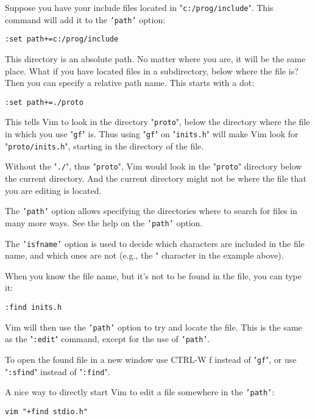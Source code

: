 Suppose you have your include files located in "\texttt{c:/prog/include}".
This command will add it to the \texttt{'path'} option:

\begin{Verbatim}[samepage=true]
 :set path+=c:/prog/include
\end{Verbatim}

This directory is an absolute path.
No matter where you are, it will be the same place.
What if you have located files in a subdirectory, below where the file is?  Then you can specify a relative path name.
This starts with a dot:

\begin{Verbatim}[samepage=true]
 :set path+=./proto
\end{Verbatim}

This tells Vim to look in the directory "\texttt{proto}", below the directory where the file in which you use "\texttt{gf}" is.
Thus using "\texttt{gf}" on "\texttt{inits.h}" will make Vim look for "\texttt{proto/inits.h}", starting in the directory of the file.

Without the "\texttt{./}", thus "\texttt{proto}", Vim would look in the "\texttt{proto}" directory below the current directory.
And the current directory might not be where the file that you are editing is located.

The \texttt{'path'} option allows specifying the directories where to search for files in many more ways.
See the help on the \texttt{'path'} option.

The \texttt{'isfname'} option is used to decide which characters are included in the file name, and which ones are not (e.g., the " character in the example above).

When you know the file name, but it's not to be found in the file, you can type it:

\begin{Verbatim}[samepage=true]
 :find inits.h
\end{Verbatim}

Vim will then use the \texttt{'path'} option to try and locate the file.
This is the same as the "\texttt{:edit}" command, except for the use of \texttt{'path'}.

To open the found file in a new window use CTRL-W f instead of "\texttt{gf}", or use "\texttt{:sfind}" instead of "\texttt{:find}".

A nice way to directly start Vim to edit a file somewhere in the \texttt{'path'}:

\begin{Verbatim}[samepage=true]
 vim "+find stdio.h"
\end{Verbatim}

